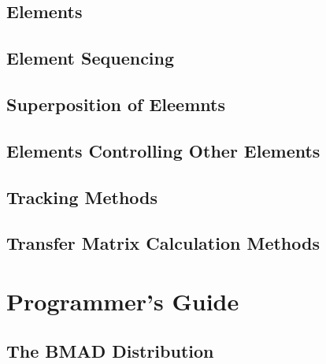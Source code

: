 \documentclass{book}
\begin{document}
\chapter{Elements}

\chapter{Element Sequencing}

\chapter{Superposition of Eleemnts}

\chapter{Elements Controlling Other Elements}

\chapter{Tracking Methods}

\chapter{Transfer Matrix Calculation Methods}

\part{Programmer's Guide}

\chapter{The BMAD Distribution}
\end{document}
